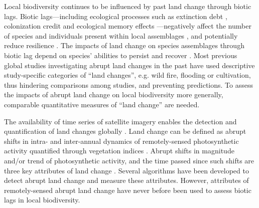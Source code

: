 Local biodiversity continues to be influenced by past land change through biotic lags. Biotic lags—including ecological processes such as extinction debt \citep{Tilman1994,Kuussaari2009,Halley2016}, colonization credit \citep{Hylander2013} and ecological memory effects \citep{Ogle2015}—negatively affect the number of species and individuals present within local assemblages \citep{Halley2016,Jung2018,Perring2018}, and potentially reduce resilience \citep{Hautier2015,Nimmo2015}. The impacts of land change on species assemblages through biotic lag depend on species’ abilities to persist \citep{Turner1998} and recover \citep{Martin2013,Fu2017,Moreno-Mateos2017}. Most previous global studies \citep{Supp2014,Fu2017,Moreno-Mateos2017,Shackelford2017} investigating abrupt land changes in the past have used descriptive study-specific categories of “land changes”, e.g. wild fire, flooding or cultivation, thus hindering comparisons among studies, and preventing predictions. To assess the impacts of abrupt land change on local biodiversity more generally, comparable quantitative measures of “land change” are needed.

The availability of time series of satellite imagery enables the detection and quantification of land changes globally \citep{Kennedy2014,Song2018}. Land change can be defined as abrupt shifts in intra- and inter-annual dynamics of remotely-sensed photosynthetic activity quantified through vegetation indices \citep{Linderman2005,Pettorelli2005}. Abrupt shifts in magnitude \citep{Kennedy2012,Watson2014,DeVries2015b} and/or trend \citep{DeJong2013} of photosynthetic activity, and the time passed since such shifts \citep{POTTER2003,Kennedy2012} are three key attributes of land change \citep{Watson2014}. Several algorithms have been developed to detect abrupt land change \citep{Zhu2017} and measure these attributes. However, attributes of remotely-sensed abrupt land change have never before been used to assess biotic lags in local biodiversity.

